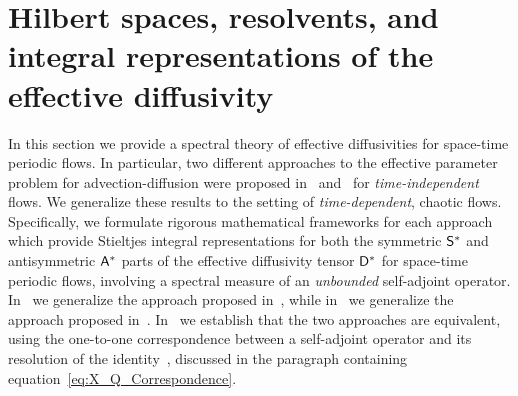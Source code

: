 \documentclass[amsa]{ipart}
\begin{document}
\section{Hilbert spaces, resolvents, and integral representations of the effective diffusivity}
\label{app:Hilbert_Resolvent_Integral_Reps} 
%
In this section we provide a spectral theory of effective
diffusivities for space-time periodic flows. In particular, two
different approaches to the effective parameter problem for
advection-diffusion were proposed
in~\cite{Pavliotis:PHD_Thesis,Bhattacharya:AAP:1999:951}  
and~\cite{Avellaneda:PRL-753,Avellaneda:CMP-339} for
\emph{time-independent} flows. We generalize these results to the
setting of \emph{time-dependent}, chaotic flows. Specifically, we
formulate rigorous mathematical 
frameworks for each approach which provide Stieltjes integral
representations for both the symmetric $\mathsf{S}^*$ and antisymmetric
$\mathsf{A}^*$ parts of the effective diffusivity tensor $\mathsf{D}^*$ for
space-time periodic flows, involving a spectral measure of an
\emph{unbounded} self-adjoint operator. In~
we generalize the approach proposed
in~\cite{Pavliotis:PHD_Thesis}, 
while in~ we generalize the approach
proposed
in~\cite{Avellaneda:PRL-753,Avellaneda:CMP-339}. In~
we establish that the two approaches are equivalent, using the
one-to-one correspondence between a self-adjoint operator and its
resolution of the identity~\cite{Stone:64}, discussed in the paragraph
containing equation~\eqref{eq:X_Q_Correspondence}.   
\end{document}
